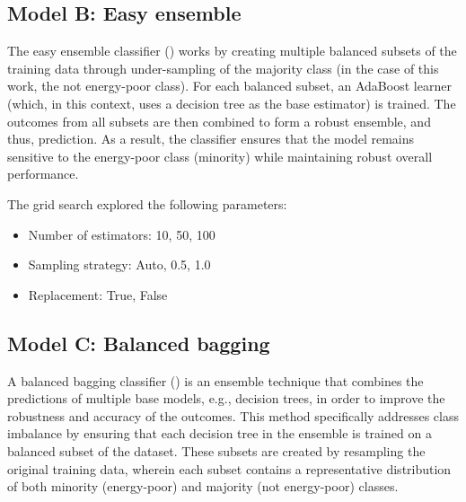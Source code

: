 \documentclass[preprint,authoryear,12pt]{elsarticle}
\newcommand{\citeTwo}[1]{(\cite{#1})}
\begin{document}
\subsection{Model B: Easy ensemble}\label{ModelB}

The easy ensemble classifier \citeTwo{LWZ09} works by creating multiple balanced subsets of the training data through under-sampling of the majority class (in the case of this work, the not energy-poor class). For each balanced subset, an AdaBoost learner (which, in this context, uses a decision tree as the base estimator) is trained. The outcomes from all subsets are then combined to form a robust ensemble, and thus, prediction. As a result, the classifier ensures that the model remains sensitive to the energy-poor class (minority) while maintaining robust overall performance.

The grid search explored the following parameters:
\begin{itemize}
\item Number of estimators: 10, 50, 100
\item Sampling strategy: Auto, 0.5, 1.0
\item Replacement: True, False
\end{itemize}

\subsection{Model C: Balanced bagging}\label{ModelC}

A balanced bagging classifier \citeTwo{GFBBH12} is an ensemble technique that combines the predictions of multiple base models, e.g., decision trees, in order to improve the robustness and accuracy of the outcomes. This method specifically addresses class imbalance by ensuring that each decision tree in the ensemble is trained on a balanced subset of the dataset. These subsets are created by resampling the original training data, wherein each subset contains a representative distribution of both minority (energy-poor) and majority (not energy-poor) classes.
\end{document}
